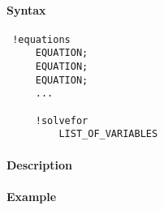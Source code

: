 


	\paragraph{Syntax}
 
 \begin{verbatim}
 !equations
     EQUATION;
     EQUATION;
     EQUATION;
     ...
 
     !solvefor
         LIST_OF_VARIABLES
 \end{verbatim}
 
 \paragraph{Description}
 
 \paragraph{Example}


